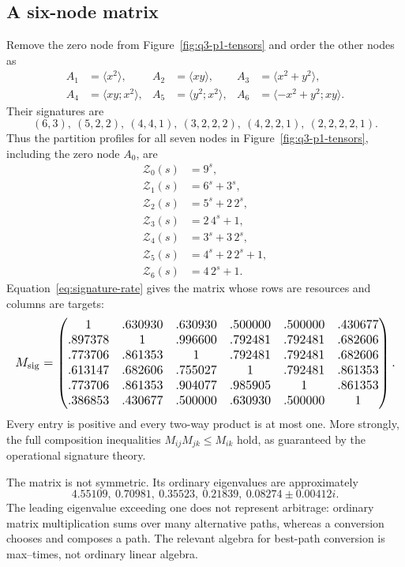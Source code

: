 \documentclass[11pt]{article}
\theoremstyle{definition}
\theoremstyle{plain}
\theoremstyle{remark}
\begin{document}
\subsection{A six-node matrix}

Remove the zero node from Figure~\ref{fig:q3-p1-tensors} and order the other
nodes as
\begin{align*}
 A_1&=\langle x^2\rangle,&
 A_2&=\langle xy\rangle,&
 A_3&=\langle x^2+y^2\rangle,\\
 A_4&=\langle xy;x^2\rangle,&
 A_5&=\langle y^2;x^2\rangle,&
 A_6&=\langle-x^2+y^2;xy\rangle.
\end{align*}
Their signatures are
\[
 (6,3),\ (5,2,2),\ (4,4,1),\ (3,2,2,2),\
 (4,2,2,1),\ (2,2,2,2,1).
\]
Thus the partition profiles for all seven nodes in
Figure~\ref{fig:q3-p1-tensors}, including the zero node \(A_0\), are
\[
\begin{aligned}
  \mathcal Z_0(s)&=9^s,\\
  \mathcal Z_1(s)&=6^s+3^s,\\
  \mathcal Z_2(s)&=5^s+2\,2^s,\\
  \mathcal Z_3(s)&=2\,4^s+1,\\
  \mathcal Z_4(s)&=3^s+3\,2^s,\\
  \mathcal Z_5(s)&=4^s+2\,2^s+1,\\
  \mathcal Z_6(s)&=4\,2^s+1.
\end{aligned}
\]
Equation~\eqref{eq:signature-rate} gives the matrix whose rows are resources
and columns are targets:
\[
\resizebox{\textwidth}{!}{$
M_{\rm sig}=
\begin{pmatrix}
1&.630930&.630930&.500000&.500000&.430677\\
.897378&1&.996600&.792481&.792481&.682606\\
.773706&.861353&1&.792481&.792481&.682606\\
.613147&.682606&.755027&1&.792481&.861353\\
.773706&.861353&.904077&.985905&1&.861353\\
.386853&.430677&.500000&.630930&.500000&1
\end{pmatrix}.
$}
\]
Every entry is positive and every two-way product is at most one.  More
strongly, the full composition inequalities
\(M_{ij}M_{jk}\le M_{ik}\) hold, as guaranteed by the operational signature
theory.

The matrix is not symmetric.  Its ordinary eigenvalues
are approximately
\[
  4.55109,\ 0.70981,\ 0.35523,\ 0.21839,
  \ 0.08274\pm0.00412i.
\]
The leading eigenvalue exceeding one does not represent arbitrage: ordinary
matrix multiplication sums over many alternative paths, whereas a conversion
chooses and composes a path.  The relevant algebra for best-path conversion is
max--times, not ordinary linear algebra.
\end{document}
